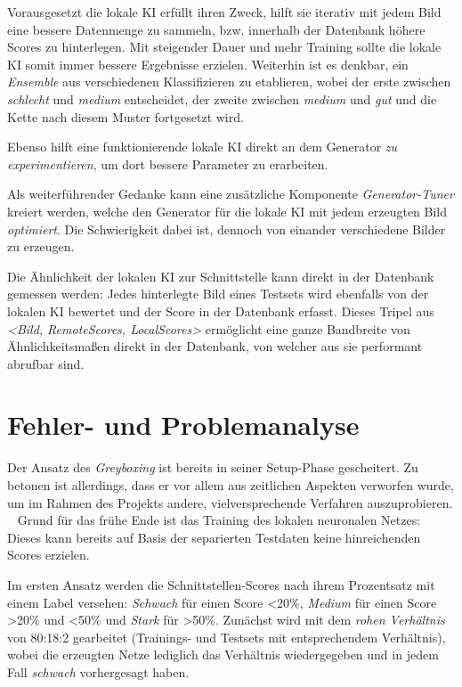 Vorausgesetzt die lokale \ac{KI} erfüllt ihren Zweck, hilft sie iterativ mit jedem Bild eine bessere Datenmenge zu sammeln, bzw. innerhalb der Datenbank höhere Scores zu hinterlegen. 
Mit steigender Dauer und mehr Training sollte die lokale \ac{KI} somit immer bessere Ergebnisse erzielen. 
Weiterhin ist es denkbar, ein \textit{Ensemble} aus verschiedenen Klassifizieren zu etablieren, wobei der erste zwischen \textit{schlecht} und \textit{medium} entscheidet, der zweite zwischen \textit{medium} und \textit{gut} und die Kette nach diesem Muster fortgesetzt wird.
 
Ebenso hilft eine funktionierende lokale \ac{KI} direkt an dem Generator \textit{zu experimentieren}, um dort bessere Parameter zu erarbeiten. 
 
Als weiterführender Gedanke kann eine zusätzliche Komponente \textit{Generator-Tuner} kreiert werden, welche den Generator für die lokale \ac{KI} mit jedem erzeugten Bild \textit{optimiert}. 
Die Schwierigkeit dabei ist, dennoch von einander verschiedene Bilder zu erzeugen. 
 
Die Ähnlichkeit der lokalen \ac{KI} zur Schnittstelle kann direkt in der Datenbank gemessen werden: 
Jedes hinterlegte Bild eines Testsets wird ebenfalls von der lokalen \ac{KI} bewertet und der Score in der Datenbank erfasst. 
Dieses Tripel aus \textit{<Bild, RemoteScores, LocalScores>} ermöglicht eine ganze Bandbreite von Ähnlichkeitsmaßen direkt in der Datenbank, von welcher aus sie performant abrufbar sind.
\newpage
\section{Fehler- und Problemanalyse}
\label{sec:ProblemGreyBoxing}
Der Ansatz des \textit{Greyboxing} ist bereits in seiner Setup-Phase gescheitert. 
Zu betonen ist allerdings, dass er vor allem aus zeitlichen Aspekten verworfen wurde, um im Rahmen des Projekts andere, vielversprechende Verfahren auszuprobieren.
~\newline
Grund für das frühe Ende ist das Training des lokalen neuronalen Netzes: 
Dieses kann bereits auf Basis der separierten Testdaten keine hinreichenden Scores erzielen. 

Im ersten Ansatz werden die Schnittstellen-Scores nach ihrem Prozentsatz mit einem Label versehen: 
\textit{Schwach} für einen Score <20\%, \textit{Medium} für einen Score >20\% und <50\% und \textit{Stark} für >50\%.
Zunächst wird mit dem \textit{rohen Verhältnis} von 80:18:2 gearbeitet (Trainings- und Testsets mit entsprechendem Verhältnis), wobei die erzeugten Netze lediglich das Verhältnis wiedergegeben und in jedem Fall \textit{schwach} vorhergesagt haben. 

